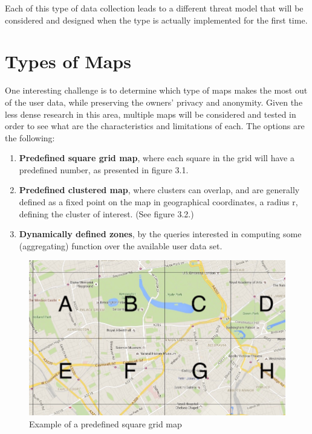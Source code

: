 Each of this type of data collection leads to a different threat model that will be considered and designed when the type is actually implemented for the first time.

\section{Types of Maps}
One interesting challenge is to determine which type of maps makes the most out of the user data, while preserving the owners' privacy and anonymity. Given the less dense research in this area, multiple maps will be considered and tested in order to see what are the characteristics and limitations of each. The options are the following:
\begin{enumerate}
\item \textbf{Predefined square grid map}, where each square in the grid will have a predefined number, as presented in figure 3.1.

\item \textbf{Predefined clustered map}, where clusters can overlap, and are generally defined as a fixed point on the map in geographical coordinates, a radius r, defining the cluster of interest. (See figure 3.2.)

\item \textbf{Dynamically defined zones}, by the queries interested in computing some (aggregating) function over the available user data set.

\end{enumerate}

\begin{figure}[ht]
\centering
\includegraphics[scale=.4]{C3/mapgrid}
\caption{Example of a predefined square grid map}
\end{figure}

